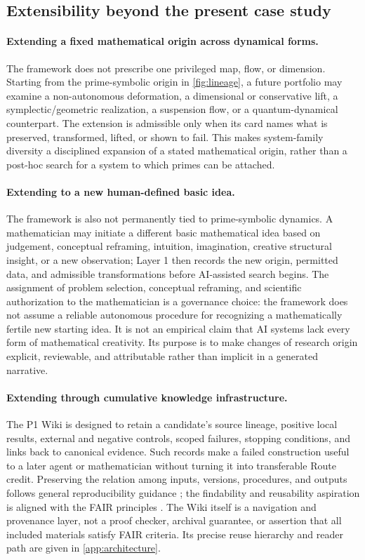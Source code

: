 \subsection{Extensibility beyond the present case study}

\paragraph{Extending a fixed mathematical origin across dynamical forms.}
The framework does not prescribe one privileged map, flow, or dimension.
Starting from the prime-symbolic origin in \cref{fig:lineage}, a future
portfolio may examine a non-autonomous deformation, a dimensional or
conservative lift, a symplectic/geometric realization, a suspension flow, or a
quantum-dynamical counterpart. The extension is admissible only when its card
names what is preserved, transformed, lifted, or shown to fail. This makes
system-family diversity a disciplined expansion of a stated mathematical
origin, rather than a post-hoc search for a system to which primes can be
attached.

\paragraph{Extending to a new human-defined basic idea.}
The framework is also not permanently tied to prime-symbolic dynamics. A
mathematician may initiate a different basic mathematical idea based on
judgement, conceptual reframing, intuition, imagination, creative structural
insight, or a new observation;
Layer 1 then records the new origin, permitted data, and admissible
transformations before AI-assisted search begins. The assignment of problem
selection, conceptual reframing, and scientific authorization to the
mathematician is a governance choice: the framework does not assume a reliable
autonomous procedure for recognizing a mathematically fertile new starting
idea. It is not an empirical claim that AI systems lack every form of
mathematical creativity. Its purpose is to make changes of research origin
explicit, reviewable, and attributable rather than implicit in a generated
narrative.

\paragraph{Extending through cumulative knowledge infrastructure.}
The P1 Wiki is designed to retain a candidate's source lineage, positive local
results, external and negative controls, scoped failures, stopping conditions,
and links back to canonical evidence. Such records make a failed construction
useful to a later agent or mathematician without turning it into transferable
Route credit. Preserving the relation among inputs, versions, procedures, and
outputs follows general reproducibility guidance \citep{Sandve2013}; the
findability and reusability aspiration is aligned with the FAIR principles
\citep{Wilkinson2016}. The Wiki itself is a navigation and
provenance layer, not a proof checker, archival guarantee, or assertion that
all included materials satisfy FAIR criteria. Its precise reuse hierarchy and
reader path are given in \cref{app:architecture}.

